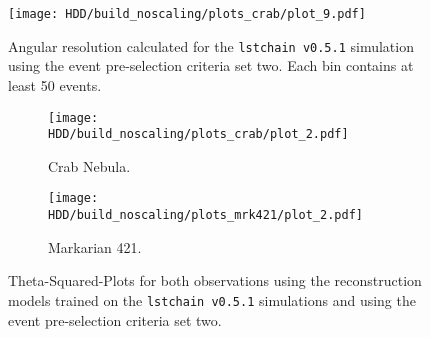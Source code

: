 \begin{figure}
    \centering
    \texttt{[image: HDD/build\_noscaling/plots\_crab/plot\_9.pdf]}
    \caption{Angular resolution calculated for the \texttt{lstchain v0.5.1} simulation using the event pre-selection criteria set two.
        Each bin contains at least 50 events.
    }
    \label{fig:ang_res_oldMC_150}
\end{figure}

\begin{figure}
    \centering
    \begin{subfigure}{0.49\textwidth}
        \centering
        \texttt{[image: HDD/build\_noscaling/plots\_crab/plot\_2.pdf]}
        \caption{Crab Nebula.}
        \label{fig:crab_oldMC_150}
    \end{subfigure}
    \hfill
    \begin{subfigure}{0.49\textwidth}
        \centering
        \texttt{[image: HDD/build\_noscaling/plots\_mrk421/plot\_2.pdf]}
        \caption{Markarian 421.}
        \label{fig:mrk_oldMC_150}
    \end{subfigure}
    \caption{Theta-Squared-Plots for both observations using the reconstruction models trained on the \texttt{lstchain v0.5.1} simulations and using 
        the event pre-selection criteria set two.
    }
    \label{fig:obs_oldMC_150}
\end{figure}


